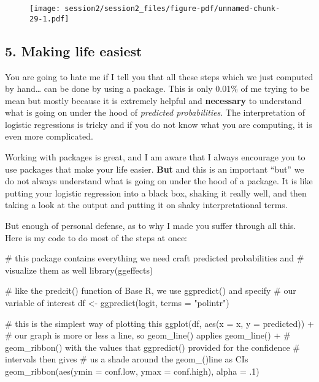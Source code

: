 \documentclass[
  letterpaper,
  DIV=11,
  numbers=noendperiod]{scrreprt}
\newenvironment{Shaded}{\begin{snugshade}}{\end{snugshade}}
\newcommand{\AttributeTok}[1]{\textcolor[rgb]{0.40,0.45,0.13}{#1}}
\newcommand{\CommentTok}[1]{\textcolor[rgb]{0.37,0.37,0.37}{#1}}
\newcommand{\DecValTok}[1]{\textcolor[rgb]{0.68,0.00,0.00}{#1}}
\newcommand{\FunctionTok}[1]{\textcolor[rgb]{0.28,0.35,0.67}{#1}}
\newcommand{\NormalTok}[1]{\textcolor[rgb]{0.00,0.23,0.31}{#1}}
\newcommand{\OtherTok}[1]{\textcolor[rgb]{0.00,0.23,0.31}{#1}}
\newcommand{\SpecialCharTok}[1]{\textcolor[rgb]{0.37,0.37,0.37}{#1}}
\newcommand{\StringTok}[1]{\textcolor[rgb]{0.13,0.47,0.30}{#1}}
\begin{document}
\begin{figure}[H]

{\centering \texttt{[image: session2/session2\_files/figure-pdf/unnamed-chunk-29-1.pdf]}

}

\end{figure}

\hypertarget{making-life-easiest}{%
\subsection{5. Making life easiest}\label{making-life-easiest}}

You are going to hate me if I tell you that all these steps which we
just computed by hand\ldots{} can be done by using a package. This is
only 0.01\% of me trying to be mean but mostly because it is extremely
helpful and \textbf{necessary} to understand what is going on under the
hood of \emph{predicted probabilities}. The interpretation of logistic
regressions is tricky and if you do not know what you are computing, it
is even more complicated.

Working with packages is great, and I am aware that I always encourage
you to use packages that make your life easier. \textbf{But} and this is
an important ``but'' we do not always understand what is going on under
the hood of a package. It is like putting your logistic regression into
a black box, shaking it really well, and then taking a look at the
output and putting it on shaky interpretational terms.

But enough of personal defense, as to why I made you suffer through all
this. Here is my code to do most of the steps at once:

\begin{Shaded}
\begin{Highlighting}[]
\CommentTok{\# this package contains everything we need craft predicted probabilities and}
\CommentTok{\# visualize them as well}
\FunctionTok{library}\NormalTok{(ggeffects)}

\CommentTok{\# like the predcit() function of Base R, we use ggpredict() and specify }
\CommentTok{\# our variable of interest }
\NormalTok{df }\OtherTok{\textless{}{-}} \FunctionTok{ggpredict}\NormalTok{(logit, }\AttributeTok{terms =} \StringTok{"polintr"}\NormalTok{)}

\CommentTok{\# this is the simplest way of plotting this}
\FunctionTok{ggplot}\NormalTok{(df, }\FunctionTok{aes}\NormalTok{(}\AttributeTok{x =}\NormalTok{ x, }\AttributeTok{y =}\NormalTok{ predicted)) }\SpecialCharTok{+}
  \CommentTok{\# our graph is more or less a line, so geom\_line() applies}
  \FunctionTok{geom\_line}\NormalTok{() }\SpecialCharTok{+}
  \CommentTok{\# geom\_ribbon() with the values that ggpredict() provided for the confidence}
  \CommentTok{\# intervals then gives}
  \CommentTok{\# us a shade around the geom\_()line as CIs}
  \FunctionTok{geom\_ribbon}\NormalTok{(}\FunctionTok{aes}\NormalTok{(}\AttributeTok{ymin =}\NormalTok{ conf.low, }\AttributeTok{ymax =}\NormalTok{ conf.high), }\AttributeTok{alpha =}\NormalTok{ .}\DecValTok{1}\NormalTok{)}
\end{Highlighting}
\end{Shaded}
\end{document}
